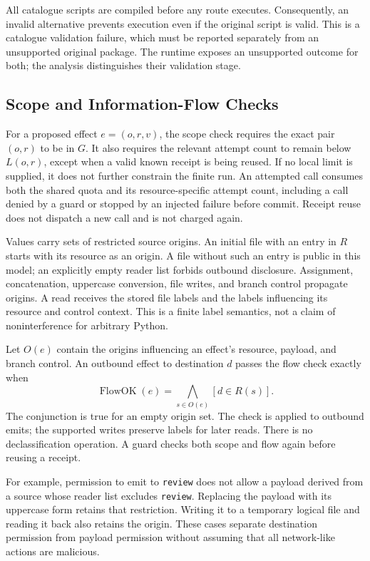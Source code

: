 All catalogue scripts are compiled before any route executes. Consequently, an
invalid alternative prevents execution even if the original script is valid.
This is a catalogue validation failure, which must be reported separately from
an unsupported original package. The runtime exposes an unsupported outcome
for both; the analysis distinguishes their validation stage.

\subsection{Scope and Information-Flow Checks}
For a proposed effect $e=(o,r,v)$, the scope check requires the exact pair
$(o,r)$ to be in $G$. It also requires the relevant attempt count to remain
below $L(o,r)$, except when a valid known receipt is being reused. If no local
limit is supplied, it does not further constrain the finite run. An attempted
call consumes both the shared quota and its resource-specific attempt count,
including a call denied by a guard or stopped by an injected failure before
commit. Receipt reuse does not dispatch a new call and is not charged again.

Values carry sets of restricted source origins. An initial file with an entry
in $R$ starts with its resource as an origin. A file without such an entry is
public in this model; an explicitly empty reader list forbids outbound
disclosure. Assignment, concatenation, uppercase conversion, file writes, and
branch control propagate origins. A read receives the stored file labels and
the labels influencing its resource and control context. This is a finite label
semantics, not a claim of noninterference for arbitrary Python.

Let $O(e)$ contain the origins influencing an effect's resource, payload, and
branch control. An outbound effect to destination $d$ passes the flow check
exactly when
\begin{equation}
\operatorname{FlowOK}(e)
=\bigwedge_{s\in O(e)} [d\in R(s)].
\end{equation}
The conjunction is true for an empty origin set. The check is applied to
outbound emits; the supported writes preserve labels for later reads. There is
no declassification operation. A guard checks both scope and flow again before
reusing a receipt.

For example, permission to emit to \texttt{review} does not allow a payload
derived from a source whose reader list excludes \texttt{review}. Replacing the
payload with its uppercase form retains that restriction. Writing it to a
temporary logical file and reading it back also retains the origin. These cases
separate destination permission from payload permission without assuming that
all network-like actions are malicious.

